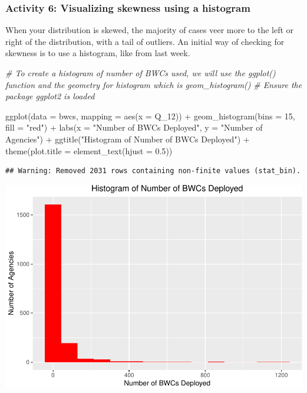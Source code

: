 \documentclass[
]{book}
\newenvironment{Shaded}{\begin{snugshade}}{\end{snugshade}}
\newcommand{\AttributeTok}[1]{\textcolor[rgb]{0.77,0.63,0.00}{#1}}
\newcommand{\CommentTok}[1]{\textcolor[rgb]{0.56,0.35,0.01}{\textit{#1}}}
\newcommand{\DecValTok}[1]{\textcolor[rgb]{0.00,0.00,0.81}{#1}}
\newcommand{\FloatTok}[1]{\textcolor[rgb]{0.00,0.00,0.81}{#1}}
\newcommand{\FunctionTok}[1]{\textcolor[rgb]{0.00,0.00,0.00}{#1}}
\newcommand{\NormalTok}[1]{#1}
\newcommand{\SpecialCharTok}[1]{\textcolor[rgb]{0.00,0.00,0.00}{#1}}
\newcommand{\StringTok}[1]{\textcolor[rgb]{0.31,0.60,0.02}{#1}}
\begin{document}
\hypertarget{activity-6-visualizing-skewness-using-a-histogram}{%
\subsubsection{Activity 6: Visualizing skewness using a histogram}\label{activity-6-visualizing-skewness-using-a-histogram}}

When your distribution is skewed, the majority of cases veer more to the left or right of the distribution, with a tail of outliers. An initial way of checking for skewness is to use a histogram, like from last week.

\begin{Shaded}
\begin{Highlighting}[]
\CommentTok{\# To create a histogram of number of BWCs used, we will use the \textasciigrave{}ggplot()\textasciigrave{} function and the geometry for histogram which is \textasciigrave{}geom\_histogram()\textasciigrave{}}
\CommentTok{\# Ensure the package ggplot2 is loaded}

\FunctionTok{ggplot}\NormalTok{(}\AttributeTok{data =}\NormalTok{ bwcs, }\AttributeTok{mapping =} \FunctionTok{aes}\NormalTok{(}\AttributeTok{x =}\NormalTok{ Q\_12)) }\SpecialCharTok{+} 
  \FunctionTok{geom\_histogram}\NormalTok{(}\AttributeTok{bins =} \DecValTok{15}\NormalTok{, }\AttributeTok{fill =} \StringTok{"red"}\NormalTok{) }\SpecialCharTok{+} 
  \FunctionTok{labs}\NormalTok{(}\AttributeTok{x =} \StringTok{"Number of BWCs Deployed"}\NormalTok{, }\AttributeTok{y =} \StringTok{"Number of Agencies"}\NormalTok{) }\SpecialCharTok{+} 
  \FunctionTok{ggtitle}\NormalTok{(}\StringTok{"Histogram of Number of BWCs Deployed"}\NormalTok{) }\SpecialCharTok{+} 
  \FunctionTok{theme}\NormalTok{(}\AttributeTok{plot.title =} \FunctionTok{element\_text}\NormalTok{(}\AttributeTok{hjust =} \FloatTok{0.5}\NormalTok{)) }
\end{Highlighting}
\end{Shaded}

\begin{verbatim}
## Warning: Removed 2031 rows containing non-finite values (stat_bin).
\end{verbatim}

\includegraphics{04-descriptive-statistics_files/figure-latex/unnamed-chunk-45-1.pdf}
\end{document}
